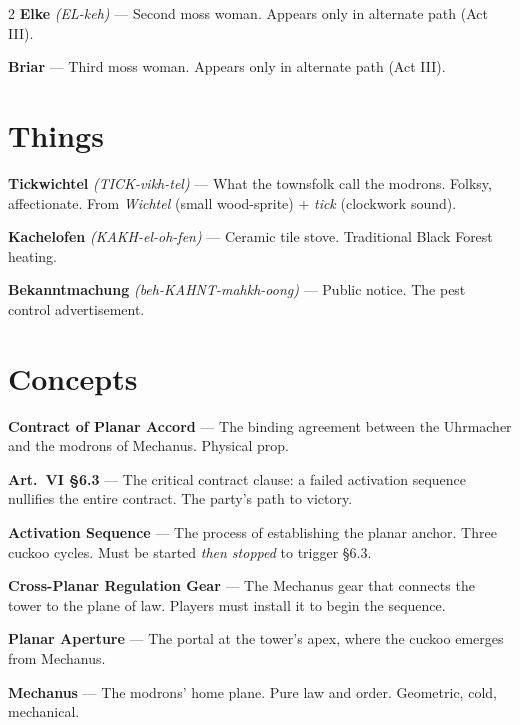 \documentclass[10pt,letterpaper]{article}
\begin{document}
\begin{multicols}{2}
\textbf{Elke} \textit{(EL-keh)} --- Second moss woman. Appears only in alternate path (Act III).

\textbf{Briar} --- Third moss woman. Appears only in alternate path (Act III).

\columnbreak

\section*{Things}

\textbf{Tickwichtel} \textit{(TICK-vikh-tel)} --- What the townsfolk call the modrons. Folksy, affectionate. From \textit{Wichtel} (small wood-sprite) + \textit{tick} (clockwork sound).

\textbf{Kachelofen} \textit{(KAKH-el-oh-fen)} --- Ceramic tile stove. Traditional Black Forest heating.

\textbf{Bekanntmachung} \textit{(beh-KAHNT-mahkh-oong)} --- Public notice. The pest control advertisement.

\section*{Concepts}

\textbf{Contract of Planar Accord} --- The binding agreement between the Uhrmacher and the modrons of Mechanus. Physical prop.

\textbf{Art.\ VI \S6.3} --- The critical contract clause: a failed activation sequence nullifies the entire contract. The party's path to victory.

\textbf{Activation Sequence} --- The process of establishing the planar anchor. Three cuckoo cycles. Must be started \textit{then stopped} to trigger \S6.3.

\textbf{Cross-Planar Regulation Gear} --- The Mechanus gear that connects the tower to the plane of law. Players must install it to begin the sequence.

\textbf{Planar Aperture} --- The portal at the tower's apex, where the cuckoo emerges from Mechanus.

\textbf{Mechanus} --- The modrons' home plane. Pure law and order. Geometric, cold, mechanical.

\end{multicols}
\end{document}
